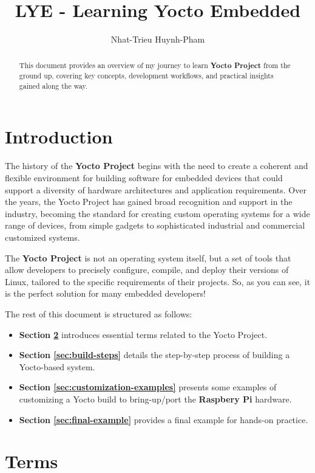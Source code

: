 \documentclass{article}
\title{LYE - Learning Yocto Embedded}
\author{Nhat-Trieu Huynh-Pham}
\begin{document}
\maketitle

\begin{abstract}
This document provides an overview of my journey to learn \textbf{Yocto Project} from the ground up, covering key concepts, development workflows, and practical insights gained along the way.
\end{abstract}

\section{Introduction}

The history of the \textbf{Yocto Project} begins with the need to create a coherent and flexible environment for building software for embedded devices that could support a diversity of hardware architectures and application requirements. Over the years, the Yocto Project has gained broad recognition and support in the industry, becoming the standard for creating custom operating systems for a wide range of devices, from simple gadgets to sophisticated industrial and commercial customized systems.

The \textbf{Yocto Project} is not an operating system itself, but a set of tools that allow developers to precisely configure, compile, and deploy their versions of Linux, tailored to the specific requirements of their projects. So, as you can see, it is the perfect solution for many embedded developers! \cite{2}

The rest of this document is structured as follows:
\begin{itemize}
    \item \textbf{Section \ref{sec:terms}} introduces essential terms related to the Yocto Project.
    \item \textbf{Section \ref{sec:build-steps}} details the step-by-step process of building a Yocto-based system.
    \item \textbf{Section \ref{sec:customization-examples}} presents some examples of customizing a Yocto build to bring-up/port the \textbf{Raspbery Pi} hardware.
    \item \textbf{Section \ref{sec:final-example}} provides a final example for hands-on practice.
\end{itemize}

\section{Terms} \label{sec:terms}
\end{document}

